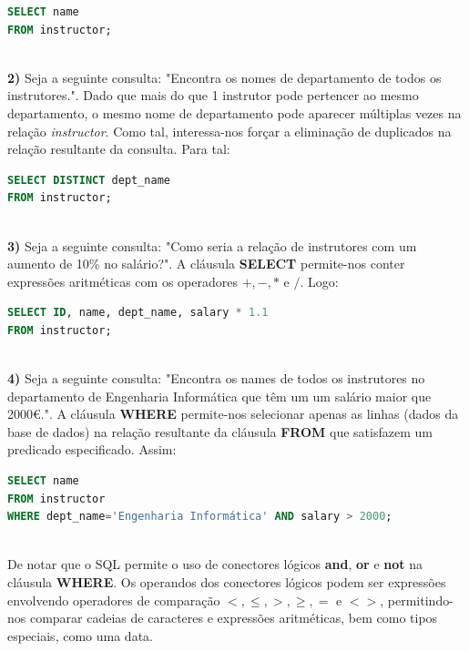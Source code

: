 \documentclass[oneside]{book}
\theoremstyle{definition}
\begin{document}
\begin{lstlisting}[language=SQL, morekeywords={REFERENCES, REFRESH, MATERIALIZED, CONCURRENTLY}, framesep=8pt, xleftmargin=40pt, framexleftmargin=40pt, frame=tb, framerule=0pt]
SELECT name
FROM instructor;
\end{lstlisting} \\
\textbf{2)} Seja a seguinte consulta: "Encontra os nomes de departamento de todos os instrutores.". Dado que mais do que 1 instrutor pode pertencer ao mesmo departamento, o mesmo nome de departamento pode aparecer múltiplas vezes na relação \textit{instructor}. Como tal, interessa-nos forçar a eliminação de duplicados na relação resultante da consulta. Para tal:

\begin{lstlisting}[language=SQL, morekeywords={REFERENCES, REFRESH, MATERIALIZED, CONCURRENTLY}, framesep=8pt, xleftmargin=40pt, framexleftmargin=40pt, frame=tb, framerule=0pt]
SELECT DISTINCT dept_name
FROM instructor;
\end{lstlisting}\\
\textbf{3)} Seja a seguinte consulta: "Como seria a relação de instrutores com um aumento de 10\% no salário?". A cláusula \textbf{SELECT} permite-nos conter expressões aritméticas com os operadores $+, -, *$ e $/$. Logo:

\begin{lstlisting}[language=SQL, morekeywords={REFERENCES, REFRESH, MATERIALIZED, CONCURRENTLY}, framesep=8pt, xleftmargin=40pt, framexleftmargin=40pt, frame=tb, framerule=0pt]
SELECT ID, name, dept_name, salary * 1.1
FROM instructor;
\end{lstlisting}\\
\textbf{4)} Seja a seguinte consulta: "Encontra os names de todos os instrutores no departamento de Engenharia Informática que têm um um salário maior que 2000€.". A cláusula \textbf{WHERE} permite-nos selecionar apenas as linhas (dados da base de dados) na relação resultante da cláusula \textbf{FROM} que satisfazem um predicado especificado. Assim:

\begin{lstlisting}[language=SQL, morekeywords={REFERENCES, REFRESH, MATERIALIZED, CONCURRENTLY}, framesep=8pt, xleftmargin=40pt, framexleftmargin=40pt, frame=tb, framerule=0pt]
SELECT name
FROM instructor
WHERE dept_name='Engenharia Informática' AND salary > 2000;
\end{lstlisting} \\
De notar que o SQL permite o uso de conectores lógicos \textbf{and}, \textbf{or} e \textbf{not} na cláusula \textbf{WHERE}. Os operandos dos conectores lógicos podem ser expressões envolvendo operadores de comparação $<, \leq, >, \geq, =$ e $<>$, permitindo-nos comparar cadeias de caracteres e expressões aritméticas, bem como tipos especiais, como uma data.
\end{document}
